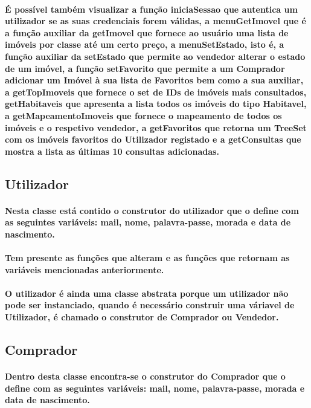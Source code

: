 \documentclass{article}
\begin{document}
\paragraph{É possível também visualizar a função iniciaSessao que autentica um utilizador se as suas credenciais forem válidas, a menuGetImovel que é a função auxiliar da getImovel que fornece ao usuário uma lista de imóveis por classe até um certo preço, a menuSetEstado, isto é, a função auxiliar da setEstado que permite ao vendedor alterar o estado de um imóvel, a função setFavorito que permite a um Comprador adicionar um Imóvel à sua lista de Favoritos bem como a sua auxiliar, a getTopImoveis que fornece o set de IDs de imóveis mais consultados, getHabitaveis que apresenta a lista todos os imóveis do tipo Habitavel, a getMapeamentoImoveis que fornece o mapeamento de todos os imóveis e o respetivo vendedor, a getFavoritos que retorna um TreeSet com os imóveis favoritos do Utilizador registado e a getConsultas que mostra a lista as últimas 10 consultas adicionadas.}

\subsection{\textbf{Utilizador}}

\paragraph{Nesta classe está contido o construtor do utilizador que o define com as seguintes variáveis: mail, nome, palavra-passe, morada e data de nascimento.}
\paragraph{Tem presente as funções que alteram e as funções que retornam as variáveis mencionadas anteriormente.}
\paragraph{O utilizador é ainda uma classe abstrata porque um utilizador não pode ser instanciado, quando é necessário construir uma váriavel de Utilizador, é chamado o construtor de Comprador ou Vendedor.}

\subsection{\textbf{Comprador}}
\paragraph{Dentro desta classe encontra-se o construtor do Comprador que o define com as seguintes variáveis: mail, nome, palavra-passe, morada e data de nascimento.}
\end{document}
